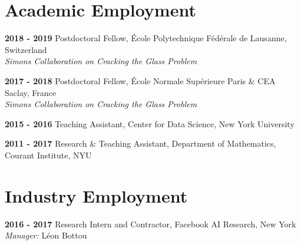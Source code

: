 \documentclass[10pt,letterpaper]{article}
\renewenvironment{itemize}
{
\begin{list}{}{\setlength{\leftmargin}{1.5em}}
}
{
  \end{list}
}
\begin{document}
\section*{Academic Employment}
\begin{itemize}
\item \textbf{2018 - 2019 } Postdoctoral Fellow, \'Ecole Polytechnique F\'ed\'erale de Lausanne, Switzerland \\ 
\hspace*{2cm} \textit{ Simons Collaboration on Cracking the Glass Problem}

\item \textbf{2017 - 2018 } Postdoctoral Fellow, \'Ecole Normale Sup\'erieure Paris \& CEA Saclay, France \\ 
\hspace*{2cm} \textit{ Simons Collaboration on Cracking the Glass Problem}

\item \textbf{2015 - 2016 } Teaching Assistant, Center for Data Science, New York University

\item \textbf{2011 - 2017 } Research \& Teaching Assistant, Department of Mathematics, Courant Institute, NYU
\end{itemize}

\section*{Industry Employment}
\begin{itemize}
\item \textbf{2016 - 2017 } Research Intern and Contractor, Facebook AI Research, New York \\ 
\hspace*{2cm} \textit{ Manager: }{L\'eon Bottou}
\end{itemize}
\end{document}
